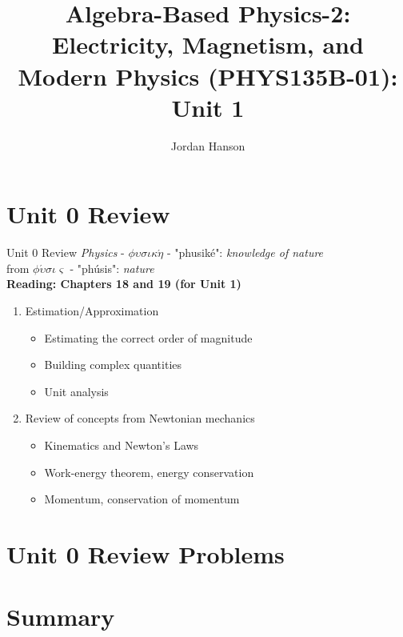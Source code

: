 \documentclass{beamer}
\title{Algebra-Based Physics-2: Electricity, Magnetism, and Modern Physics (PHYS135B-01): Unit 1}
\author{Jordan Hanson}
\institute{Whittier College Department of Physics and Astronomy}
\begin{document}
\maketitle

\section{Unit 0 Review}

\begin{frame}{Unit 0 Review}
\textit{Physics} - $\phi\upsilon\sigma\iota\kappa\acute{\eta}$ - "phusik\'e": \textit{knowledge of nature} \\
from $\phi\acute{\upsilon}\sigma\iota\varsigma$ - "ph\'usis": \textit{nature} \\
\textbf{Reading: Chapters 18 and 19 (for Unit 1)}
\begin{enumerate}
\item Estimation/Approximation
\begin{itemize}
\item \alert{Estimating} the correct order of magnitude
\item \alert{Building} complex quantities
\item \alert{Unit analysis}
\end{itemize}
\item Review of concepts from Newtonian mechanics
\begin{itemize}
\item Kinematics and \alert{Newton's Laws}
\item Work-energy theorem, energy conservation
\item Momentum, conservation of momentum
\end{itemize}
\end{enumerate}
\end{frame}

\section{Unit 0 Review Problems}

\section{Summary}
\end{document}
